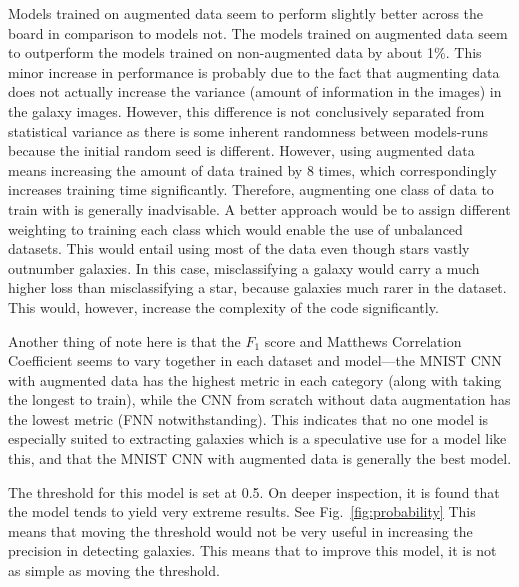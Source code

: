 \documentclass[a4paper,fleqn,usenatbib]{mnras}
\begin{document}
Models trained on augmented data seem to perform slightly better across the board in comparison to models not. The models trained on augmented data seem to outperform the models trained on non-augmented data by about 1\%. This minor increase in performance is probably due to the fact that augmenting data does not actually increase the variance (amount of information in the images) in the galaxy images. However, this difference is not conclusively separated from statistical variance as there is some inherent randomness between models-runs because the initial random seed is different. However, using augmented data means increasing the amount of data trained by 8 times, which correspondingly increases training time significantly. Therefore, augmenting one class of data to train with is generally inadvisable. A better approach would be to assign different weighting to training each class which would enable the use of unbalanced datasets. This would entail using most of the data even though stars vastly outnumber galaxies. In this case, misclassifying a galaxy would carry a much higher loss than misclassifying a star, because galaxies much rarer in the dataset. This would, however, increase the complexity of the code significantly. 

Another thing of note here is that the $F_1$ score and Matthews Correlation Coefficient seems to vary together in each dataset and model---the MNIST CNN with augmented data has the highest metric in each category (along with taking the longest to train), while the CNN from scratch without data augmentation has the lowest metric (FNN notwithstanding). This indicates that no one model is especially suited to extracting galaxies which is a speculative use for a model like this, and that the MNIST CNN with augmented data is generally the best model.

The threshold for this model is set at 0.5. On deeper inspection, it is found that the model tends to yield very extreme results. See Fig.~\ref{fig:probability} This means that moving the threshold would not be very useful in increasing the precision in detecting galaxies. This means that to improve this model, it is not as simple as moving the threshold. 
\end{document}
